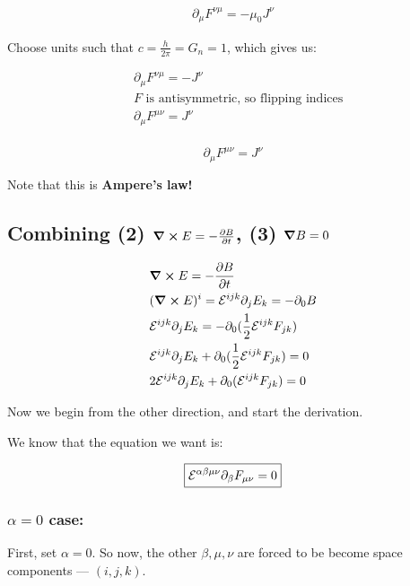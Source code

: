 \begin{align*}
    \partial_\mu F^{\nu \mu} = - \mu_0 J^{\nu}
\end{align*}

Choose units such that $c = \frac{h}{2 \pi} = G_n = 1$, which gives us:


\begin{align*}
    &\partial_\mu F^{\nu \mu} = -  J^{\nu} \\
    &\text{$F$ is antisymmetric, so flipping indices} \\
    &\partial_\mu F^{\mu \nu} =  J^{\nu} \\
\end{align*}

\begin{equation}
    \boxed{ \partial_\mu F^{\mu \nu} =  J^{\nu} }
\end{equation}

Note that this is \textbf{Ampere's law!}

\subsection{Combining (2) $\curl E = - \pdv{B}{t}$, (3) $\grad B = 0$}

\begin{align*}
    &\curl E = - \pdv{B}{t} \\
    &(\curl E)^i = \mathcal{E}^{ijk} \partial_j E_k = - \partial_0 B \\
    &\mathcal{E}^{ijk} \partial_j E_k = - \partial_0 (\frac{1}{2} \mathcal{E}^{ijk} F_{jk}) \\
    &\mathcal{E}^{ijk} \partial_j E_k  + \partial_0 (\frac{1}{2} \mathcal{E}^{ijk} F_{jk})  = 0 \\
    &2\mathcal{E}^{ijk} \partial_j E_k  + \partial_0 (\mathcal{E}^{ijk} F_{jk})  = 0 \\
\end{align*}

Now we begin from the other direction, and start the derivation.

We know that the equation we want is:

\begin{equation}
    \boxed{\mathcal{E}^{\alpha \beta \mu \nu}  \partial_{\beta} F_{\mu \nu} = 0}
\end{equation}

\subsubsection{$\alpha = 0$ case:}
First, set $\alpha = 0$. So now, the other $\beta, \mu, \nu$ are forced to be
become space components --- $(i, j, k)$.

